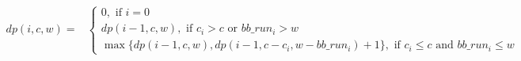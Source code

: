 \begin{strip}
        \begin{align}
                dp(i, c, w) = &
                \left\{
                        \begin{array}{l}
                                0, \text{ if $i=0$ } \\ [1em]
                                dp(i-1, c, w), \text{ if $c_i > c$ or $bb\_run_i > w$} \\ [1em]
                                \max \{ dp(i-1, c, w), dp(i-1, c - c_i, w - bb\_run_i) + 1 \}, \text{ if $c_i \leq c$ and $bb\_run_i \leq w$}
                        \end{array} 
                \right.
                \label{Equ:MaxProductRecursion}
        \end{align}
\end{strip}

